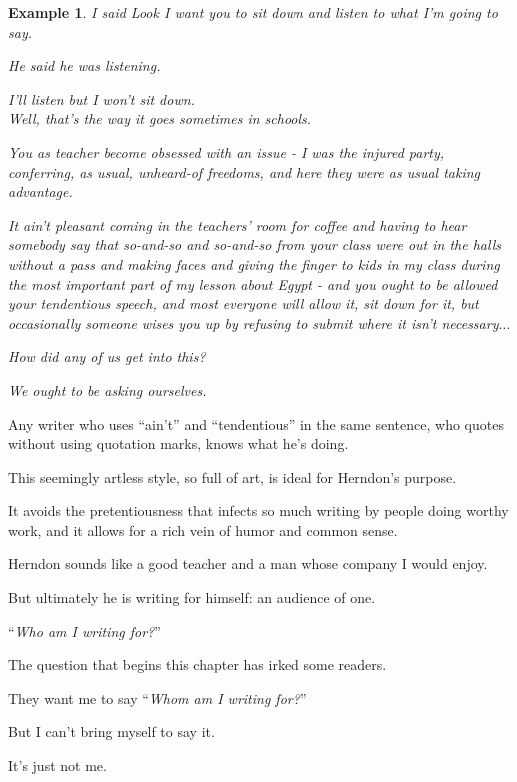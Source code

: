 \documentclass{book}
\numberwithin{equation}{section}
\newtheorem{example}{Example}[chapter]
\begin{document}
\begin{example}
    I said Look I want you to sit down and listen to what I'm going to say.
    
    He said he \textit{was} listening.
    
    I'll listen but I won't sit down.
    \\
    
    Well, that's the way it goes sometimes in schools.
    
    You as teacher become obsessed with an issue - I was the injured party, conferring, as usual, unheard-of freedoms, and here they were as usual taking advantage.
    
    It ain't pleasant coming in the teachers' room for coffee and having to hear somebody say that so-and-so and so-and-so from \textit{your} class were out in the halls \textit{without a pass} and \textit{making faces} and \textit{giving the finger} to kids in \textit{my} class during the most \textit{important} part of \textit{my} lesson about \textit{Egypt} - and you ought to be allowed your tendentious speech, and most everyone will allow it, sit down for it, but occasionally someone wises you up by refusing to submit where it isn't necessary$\ldots$
    
    How did any of us get into this?
    
    We ought to be asking ourselves.
\end{example}
Any writer who uses ``ain't'' and ``tendentious'' in the same sentence, who quotes without using quotation marks, knows what he's doing.

This seemingly artless style, so full of art, is ideal for Herndon's purpose.

It avoids the pretentiousness that infects so much writing by people doing worthy work, and it allows for a rich vein of humor and common sense.

Herndon sounds like a good teacher and a man whose company I would enjoy.

But ultimately he is writing for himself: an audience of one.

%
``\textit{Who am I writing for?}''

The question that begins this chapter has irked some readers.

They want me to say ``\textit{Whom am I writing for?}''

But I can't bring myself to say it.

It's just not me.

\end{document}
